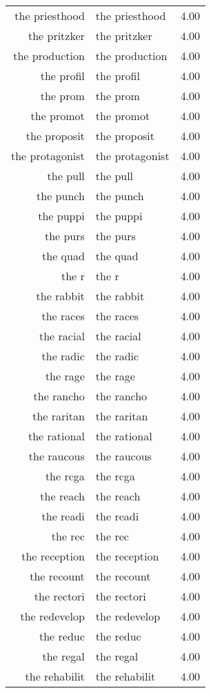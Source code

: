 \begin{table}[ht]
\begin{tabular}{rlr}
  the priesthood & the priesthood & 4.00 \\ 
  the pritzker & the pritzker & 4.00 \\ 
  the production & the production & 4.00 \\ 
  the profil & the profil & 4.00 \\ 
  the prom & the prom & 4.00 \\ 
  the promot & the promot & 4.00 \\ 
  the proposit & the proposit & 4.00 \\ 
  the protagonist & the protagonist & 4.00 \\ 
  the pull & the pull & 4.00 \\ 
  the punch & the punch & 4.00 \\ 
  the puppi & the puppi & 4.00 \\ 
  the purs & the purs & 4.00 \\ 
  the quad & the quad & 4.00 \\ 
  the r & the r & 4.00 \\ 
  the rabbit & the rabbit & 4.00 \\ 
  the races & the races & 4.00 \\ 
  the racial & the racial & 4.00 \\ 
  the radic & the radic & 4.00 \\ 
  the rage & the rage & 4.00 \\ 
  the rancho & the rancho & 4.00 \\ 
  the raritan & the raritan & 4.00 \\ 
  the rational & the rational & 4.00 \\ 
  the raucous & the raucous & 4.00 \\ 
  the rcga & the rcga & 4.00 \\ 
  the reach & the reach & 4.00 \\ 
  the readi & the readi & 4.00 \\ 
  the rec & the rec & 4.00 \\ 
  the reception & the reception & 4.00 \\ 
  the recount & the recount & 4.00 \\ 
  the rectori & the rectori & 4.00 \\ 
  the redevelop & the redevelop & 4.00 \\ 
  the reduc & the reduc & 4.00 \\ 
  the regal & the regal & 4.00 \\ 
  the rehabilit & the rehabilit & 4.00 \\ 

\end{tabular}
\end{table}
